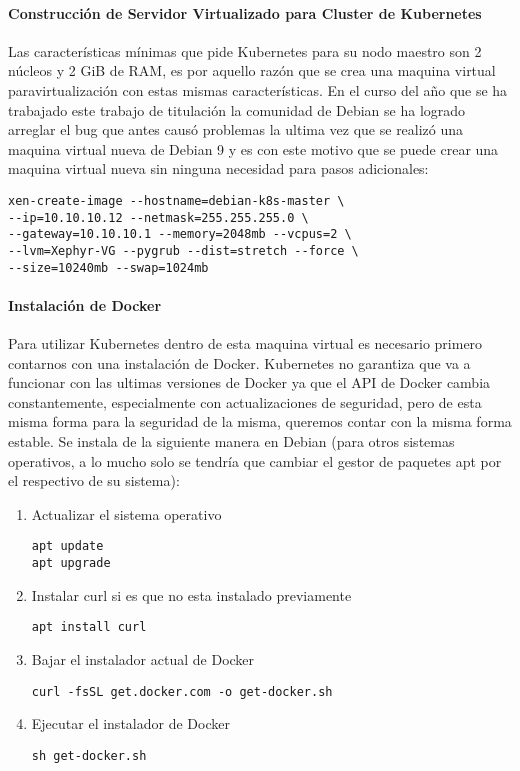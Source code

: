 \paragraph{Construcción de Servidor Virtualizado para Cluster de Kubernetes}
Las características mínimas que pide Kubernetes para su nodo maestro son 2 núcleos y 2 GiB de RAM, es por aquello razón que se crea una maquina virtual paravirtualización con estas mismas características. En el curso del año que se ha trabajado este trabajo de titulación la comunidad de Debian se ha logrado arreglar  el bug que antes causó problemas la ultima vez que se realizó una maquina virtual nueva de Debian 9 y es con este motivo que se puede crear una maquina virtual nueva sin ninguna necesidad para pasos adicionales:
\begin{lstlisting}
xen-create-image --hostname=debian-k8s-master \
--ip=10.10.10.12 --netmask=255.255.255.0 \
--gateway=10.10.10.1 --memory=2048mb --vcpus=2 \
--lvm=Xephyr-VG --pygrub --dist=stretch --force \
--size=10240mb --swap=1024mb
\end{lstlisting}

\paragraph{Instalación de Docker}
Para utilizar Kubernetes dentro de esta maquina virtual es necesario primero contarnos con una instalación de Docker. Kubernetes no garantiza que va a funcionar con las ultimas versiones de Docker ya que el API de Docker cambia constantemente, especialmente con actualizaciones de seguridad, pero de esta misma forma para la seguridad de la misma, queremos contar con la misma forma estable. Se instala de la siguiente manera en Debian (para otros sistemas operativos, a lo mucho solo se tendría que cambiar el gestor de paquetes apt por el respectivo de su sistema):
\begin{enumerate}
	\item Actualizar el sistema operativo
    \begin{lstlisting}
apt update
apt upgrade
    \end{lstlisting}
    \item Instalar curl si es que no esta instalado previamente
    \begin{lstlisting}
apt install curl
    \end{lstlisting}
    \item Bajar el instalador actual de Docker
    \begin{lstlisting}
curl -fsSL get.docker.com -o get-docker.sh
    \end{lstlisting}
    \item Ejecutar el instalador de Docker
    \begin{lstlisting}
sh get-docker.sh
    \end{lstlisting}
\end{enumerate}

